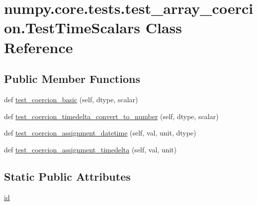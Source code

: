 \hypertarget{classnumpy_1_1core_1_1tests_1_1test__array__coercion_1_1TestTimeScalars}{}\section{numpy.\+core.\+tests.\+test\+\_\+array\+\_\+coercion.\+Test\+Time\+Scalars Class Reference}
\label{classnumpy_1_1core_1_1tests_1_1test__array__coercion_1_1TestTimeScalars}
\subsection*{Public Member Functions}
\begin{DoxyCompactItemize}
\item 
def \hyperlink{classnumpy_1_1core_1_1tests_1_1test__array__coercion_1_1TestTimeScalars_a704a918210b7d4353e454d3eb4b9eeca}{test\+\_\+coercion\+\_\+basic} (self, dtype, scalar)
\item 
def \hyperlink{classnumpy_1_1core_1_1tests_1_1test__array__coercion_1_1TestTimeScalars_aba5ace56aff203a78d1c0d9a42f2476b}{test\+\_\+coercion\+\_\+timedelta\+\_\+convert\+\_\+to\+\_\+number} (self, dtype, scalar)
\item 
def \hyperlink{classnumpy_1_1core_1_1tests_1_1test__array__coercion_1_1TestTimeScalars_a3d4ff3ada89dd6378f0055a87377ee54}{test\+\_\+coercion\+\_\+assignment\+\_\+datetime} (self, val, unit, dtype)
\item 
def \hyperlink{classnumpy_1_1core_1_1tests_1_1test__array__coercion_1_1TestTimeScalars_a5f3b6b86dc420ee002284e4392c6d076}{test\+\_\+coercion\+\_\+assignment\+\_\+timedelta} (self, val, unit)
\end{DoxyCompactItemize}
\subsection*{Static Public Attributes}
\begin{DoxyCompactItemize}
\item 
\hyperlink{classnumpy_1_1core_1_1tests_1_1test__array__coercion_1_1TestTimeScalars_ac3fb25578c27032225645dcd238cbb2f}{id}
\end{DoxyCompactItemize}


